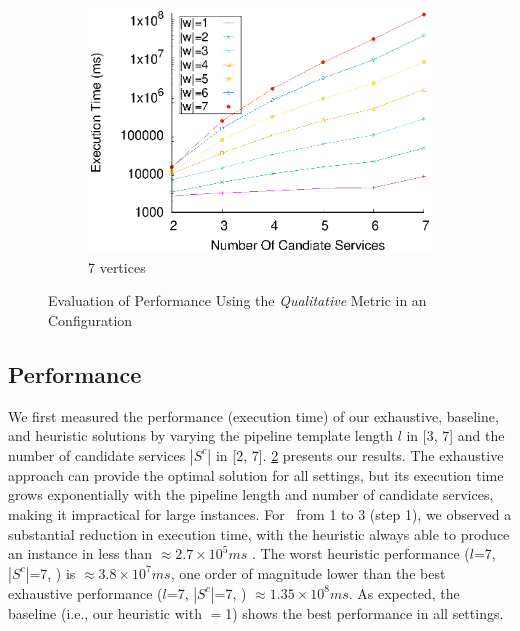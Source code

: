 \begin{figure}[!ht]
\begin{subfigure}{0.45\textwidth}
        \includegraphics[width=\textwidth]{Images/graphs/window_time_performance_qualitative_n7_s7_50_80_n7}
        \caption{7 vertices}
        \label{fig:time_window_perce_wide_7n}
      \end{subfigure}
      \caption{{\color{OurColor2}Evaluation of Performance Using the \emph{Qualitative} Metric in an  \average Configuration}}
      \label{fig:time_window_perce_average}
    \end{figure}
    \subsection{Performance}\label{subsec:experiments_performance}
    We first measured the performance (execution time) of our exhaustive, baseline, and heuristic solutions by varying the pipeline template length $l$ in [3, 7] and the number of candidate services $|S^c|$ in [2, 7]. \cref{fig:time_window_perce_average} presents our results.
    The exhaustive approach can provide the optimal solution for all settings, but its execution time grows exponentially with the pipeline length and number of candidate services, making it impractical for large instances. For \windowsize\ from 1 to 3 (step 1), we observed a substantial reduction in execution time, with the heuristic always able to produce an instance in less than $\approx2.7\times10^5ms$ . The worst heuristic performance ($l$=7, $|S^c|$=7, ) is $\approx3.8\times10^7ms$, one order of magnitude lower than the best exhaustive performance ($l$=7, $|S^c|$=7, ) $\approx1.35\times10^8ms$. {\color{OurColor} As expected, the baseline (i.e., our heuristic with \windowsize$=$1) shows the best performance in all settings.}


